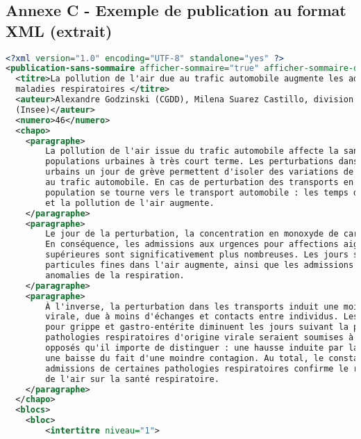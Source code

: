 \subsection*{Annexe C - Exemple de publication au format XML (extrait)}
\begin{lstlisting}[language=XML, basicstyle=\small]
<?xml version="1.0" encoding="UTF-8" standalone="yes" ?> 
<publication-sans-sommaire afficher-sommaire="true" afficher-sommaire-documentation="false">
  <titre>La pollution de l'air due au trafic automobile augmente les admissions aux urgences pour 
  maladies respiratoires </titre> 
  <auteur>Alexandre Godzinski (CGDD), Milena Suarez Castillo, division Marchés et entreprises 
  (Insee)</auteur> 
  <numero>46</numero> 
  <chapo>
    <paragraphe>
        La pollution de l'air issue du trafic automobile affecte la santé respiratoire des 
        populations urbaines à très court terme. Les perturbations dans les transports en commun 
        urbains un jour de grève permettent d'isoler des variations de pollution de l'air attribuables
        au trafic automobile. En cas de perturbation des transports en commun, une partie de la 
        population se tourne vers le transport automobile : les temps de parcours sont alors plus longs, 
        et la pollution de l'air augmente.
    </paragraphe> 
    <paragraphe>
        Le jour de la perturbation, la concentration en monoxyde de carbone est plus élevée.
        En conséquence, les admissions aux urgences pour affections aigues des voies respiratoires 
        supérieures sont significativement plus nombreuses. Les jours suivants, la concentration en 
        particules fines dans l'air augmente, ainsi que les admissions aux urgences pour 
        anomalies de la respiration.
    </paragraphe> 
    <paragraphe>
        À l'inverse, la perturbation dans les transports induit une moindre propagation
        virale, due à moins d'échanges et contacts entre individus. Les admissions aux urgences 
        pour grippe et gastro-entérite diminuent les jours suivant la perturbation. Ainsi, les 
        pathologies respiratoires d'origine virale seraient soumises à deux phénomènes aux effets 
        opposés qu'il importe de distinguer : une hausse induite par la pollution de l'air accrue, 
        une baisse du fait d'une moindre contagion. Au total, le constat d'une hausse des 
        admissions de certaines pathologies respiratoires confirme le rôle néfaste de la pollution
        de l'air sur la santé respiratoire.
    </paragraphe> 
  </chapo>
  <blocs>
    <bloc>
        <intertitre niveau="1">

\end{lstlisting}
